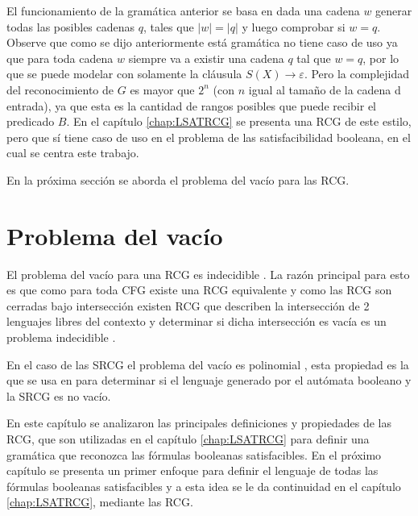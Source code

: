 El funcionamiento de la gramática anterior se basa en dada una cadena $w$ generar todas las posibles cadenas
$q$, tales que $|w|=|q|$ y luego comprobar si $w = q$. Observe que como se dijo anteriormente está gramática
no tiene caso de uso ya que para toda cadena $w$ siempre va a existir una cadena $q$ tal que $w=q$, por lo
que se puede modelar con solamente la cláusula $S(X)\to \varepsilon$. Pero la complejidad del reconocimiento
de $G$ es mayor que $2^n$ (con $n$ igual al tamaño de la cadena d entrada), ya que esta es la cantidad de
rangos posibles que puede recibir el predicado $B$.  En el capítulo \ref{chap:LSATRCG} se presenta una RCG de
este estilo, pero que sí tiene caso de uso en el problema de las satisfacibilidad booleana, en el cual se centra este trabajo.

En la próxima sección se aborda el problema del vacío para las RCG.

\section{Problema del vacío}

El problema del vacío para una RCG es indecidible \cite{propertiesRCGBib}.
La razón principal para esto es que como para toda CFG existe una RCG equivalente y como las RCG son cerradas
bajo intersección existen RCG que describen la intersección de 2 lenguajes libres del contexto y determinar
si dicha intersección es vacía es un problema indecidible \cite{propertiesRCGBib}.

En el caso de las SRCG el problema del vacío es polinomial \cite{mainRCGBib}, esta propiedad es la que se usa en \cite{aSRCSAT}
para determinar si el lenguaje generado por el autómata booleano y la SRCG es no vacío.

En este capítulo se analizaron las principales definiciones y propiedades de las RCG, que son utilizadas en el capítulo \ref{chap:LSATRCG}
para definir una gramática que reconozca las fórmulas booleanas satisfacibles. En el próximo capítulo se presenta
un primer enfoque para definir el lenguaje de todas las fórmulas booleanas satisfacibles y a esta idea se le da
continuidad en el capítulo \ref{chap:LSATRCG}, mediante las RCG.
